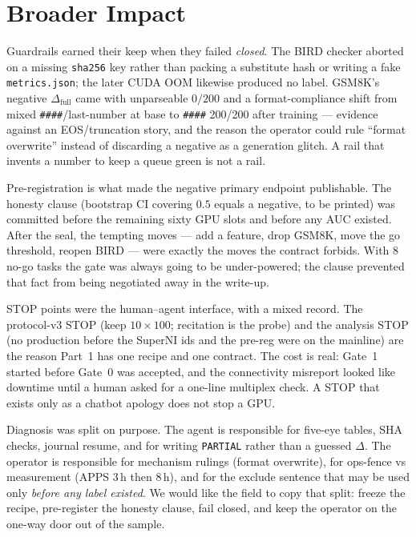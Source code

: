 \section{Broader Impact}
\label{sec:part3}

Guardrails earned their keep when they failed \emph{closed}.
The BIRD checker aborted on a missing \texttt{sha256} key rather
than packing a substitute hash or writing a fake
\texttt{metrics.json}; the later CUDA OOM likewise produced no
label.
GSM8K's negative $\Delta_{\mathrm{full}}$ came with unparseable
$0/200$ and a format-compliance shift from mixed
\texttt{\#\#\#\#}/last-number at base to \texttt{\#\#\#\#} 200/200
after training --- evidence against an EOS/truncation story, and
the reason the operator could rule ``format overwrite'' instead of
discarding a negative as a generation glitch.
A rail that invents a number to keep a queue green is not a rail.

Pre-registration is what made the negative primary endpoint
publishable. The honesty clause (bootstrap CI covering $0.5$
equals a negative, to be printed) was committed before the
remaining sixty GPU slots and before any AUC existed.
After the seal, the tempting moves --- add a feature, drop GSM8K,
move the go threshold, reopen BIRD --- were exactly the moves the
contract forbids. With 8 no-go tasks the gate was always going to
be under-powered; the clause prevented that fact from being
negotiated away in the write-up.

STOP points were the human--agent interface, with a mixed record.
The protocol-v3 STOP (keep $10{\times}100$; recitation is the probe)
and the analysis STOP (no production before the SuperNI ids and
the pre-reg were on the mainline) are the reason Part~1 has one
recipe and one contract.
The cost is real: Gate~1 started before Gate~0 was accepted, and
the connectivity misreport looked like downtime until a human
asked for a one-line multiplex check.
A STOP that exists only as a chatbot apology does not stop a GPU.

Diagnosis was split on purpose. The agent is responsible for
five-eye tables, SHA checks, journal resume, and for writing
\texttt{PARTIAL} rather than a guessed $\Delta$. The operator is
responsible for mechanism rulings (format overwrite), for
ops-fence vs measurement (APPS 3\,h then 8\,h), and for the
exclude sentence that may be used only
\emph{before any label existed}.
We would like the field to copy that split: freeze the recipe,
pre-register the honesty clause, fail closed, and keep the
operator on the one-way door out of the sample.
